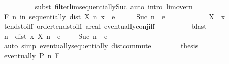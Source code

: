 \begin{isabellebody}
\ \ \ \ \ \ \ \ \isamarkupfalse%
\ {\isacharparenleft}{\kern0pt}subst\ filterlim{\isacharunderscore}{\kern0pt}sequentially{\isacharunderscore}{\kern0pt}Suc{\isacharparenright}{\kern0pt}\ {\isacharparenleft}{\kern0pt}auto\ intro{\isacharbang}{\kern0pt}{\isacharcolon}{\kern0pt}\ lim{\isacharunderscore}{\kern0pt}{}{\isacharunderscore}{\kern0pt}over{\isacharunderscore}{\kern0pt}n{\isacharparenright}{\kern0pt}\isanewline
\ \ \ \ \ \ \isamarkupfalse%
\ \isamarkupfalse%
\ {\isachardoublequoteopen}{\isasymforall}\isactrlsub F\ n\ in\ sequentially{\isachardot}{\kern0pt}\ dist\ {\isacharparenleft}{\kern0pt}X\ n{\isacharparenright}{\kern0pt}\ x\ {\isacharless}{\kern0pt}\ e\ {\isacharslash}{\kern0pt}\ {}\ {\isasymand}\ {}\ {\isacharslash}{\kern0pt}\ Suc\ n\ {\isacharless}{\kern0pt}\ e\ {\isacharslash}{\kern0pt}\ {}{\isachardoublequoteclose}\isanewline
\ \ \ \ \ \ \ \ \isamarkupfalse%
\ {\isacartoucheopen}X\ {\isasymlonglonglongrightarrow}\ x{\isacartoucheclose}\isanewline
\ \ \ \ \ \ \ \ \isamarkupfalse%
\ tendsto{\isacharunderscore}{\kern0pt}iff\ order{\isacharunderscore}{\kern0pt}tendsto{\isacharunderscore}{\kern0pt}iff{\isacharbrackleft}{\kern0pt}\ {\isacharprime}{\kern0pt}a{\isacharequal}{\kern0pt}real{\isacharbrackright}{\kern0pt}\ eventually{\isacharunderscore}{\kern0pt}conj{\isacharunderscore}{\kern0pt}iff\isanewline
\ \ \ \ \ \ \ \ \isamarkupfalse%
\ blast\isanewline
\ \ \ \ \ \ \isamarkupfalse%
\ \isamarkupfalse%
\ n\ \ {\isachardoublequoteopen}dist\ x\ {\isacharparenleft}{\kern0pt}X\ n{\isacharparenright}{\kern0pt}\ {\isacharless}{\kern0pt}\ e\ {\isacharslash}{\kern0pt}\ {}{\isachardoublequoteclose}\ {\isachardoublequoteopen}{}\ {\isacharslash}{\kern0pt}\ Suc\ n\ {\isacharless}{\kern0pt}\ e\ {\isacharslash}{\kern0pt}\ {}{\isachardoublequoteclose}\isanewline
\ \ \ \ \ \ \ \ \isamarkupfalse%
\ {\isacharparenleft}{\kern0pt}auto\ simp{\isacharcolon}{\kern0pt}\ eventually{\isacharunderscore}{\kern0pt}sequentially\ dist{\isacharunderscore}{\kern0pt}commute{\isacharparenright}{\kern0pt}\isanewline
\ \ \ \ \ \ \isamarkupfalse%
\ {\isacharquery}{\kern0pt}thesis\isanewline
\ \ \ \ \ \ \ \ \isamarkupfalse%
\ {\isacartoucheopen}eventually\ {\isacharparenleft}{\kern0pt}P\ n{\isacharparenright}{\kern0pt}\ F{\isacartoucheclose}\isanewline
\ \ \ \ \ \ \isamarkupfalse%

\end{isabellebody}
